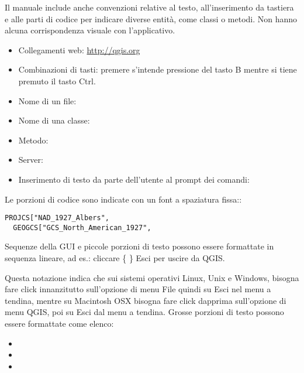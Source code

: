 
Il manuale include anche convenzioni relative al testo, all’inserimento da tastiera e alle parti di codice
per indicare diverse entità, come classi o metodi. Non hanno alcuna corrispondenza visuale con l'applicativo.

\begin{itemize}[label=--]
\item Collegamenti web: \url{http://qgis.org}
\item Combinazioni di tasti: premere  s'intende pressione del tasto B mentre si tiene premuto il tasto Ctrl.
\item Nome di un file: 
\item Nome di una classe: 
\item Metodo: 
\item Server: 
\item Inserimento di testo da parte dell’utente al prompt dei comandi: 
\end{itemize}

Le porzioni di codice sono indicate con un font a spaziatura fissa::
\begin{verbatim}
PROJCS["NAD_1927_Albers",
  GEOGCS["GCS_North_American_1927",
\end{verbatim}


Sequenze della GUI e piccole porzioni di testo possono essere formattate in sequenza lineare, 
ad es.: cliccare \{\nix{} \} \arrow Esci per uscire da QGIS.

Questa notazione indica che sui sistemi operativi Linux, Unix e Windows, bisogna fare click 
innanzitutto sull’opzione di menu File quindi su Esci nel menu a tendina, mentre su Macintosh 
OSX bisogna fare click dapprima sull’opzione di menu QGIS, poi su Esci dal menu a tendina. 
Grosse porzioni di testo possono essere formattate come elenco:

\begin{itemize}
\item {}
\item {}
\item {}
\end{itemize}

